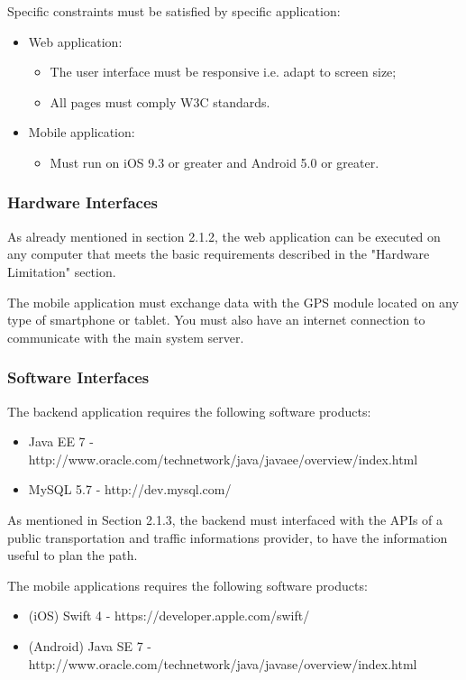 \documentclass{article}
\begin{document}
	\bigskip
	\bigskip
	Specific constraints must be satisfied by specific application:
	\begin{itemize}
		\item Web application:
			\begin{itemize}
				\item The user interface must be responsive i.e. adapt to screen size;
				\item All pages must comply W3C standards.
			\end{itemize}
		\item Mobile application:
			\begin{itemize}
				\item Must run on iOS 9.3 or greater and Android 5.0 or greater.
			\end{itemize}
	\end{itemize}

	
	
	\subsubsection{Hardware Interfaces}
	As already mentioned in section 2.1.2, the web application can be executed on any computer that meets the basic requirements described in the "Hardware Limitation" section.
	
	\bigskip
	The mobile application must exchange data with the GPS module located on any type of smartphone or tablet. You must also have an internet connection to communicate with the main system server.

	
	\subsubsection{Software Interfaces}
	The backend application requires the following software products:
	\begin{itemize}
		\item Java EE 7 - http://www.oracle.com/technetwork/java/javaee/overview/index.html
		\item MySQL 5.7 - http://dev.mysql.com/
	\end{itemize}
	
	\bigskip
	As mentioned in Section 2.1.3, the backend must interfaced with the APIs of a public transportation and  traffic informations provider, to have the information useful to plan the path.
	
	\bigskip
	The mobile applications requires the following software products:
	\begin{itemize}
		\item (iOS) Swift 4 - https://developer.apple.com/swift/
		\item (Android) Java SE 7 - http://www.oracle.com/technetwork/java/javase/overview/index.html
	\end{itemize}
\end{document}
